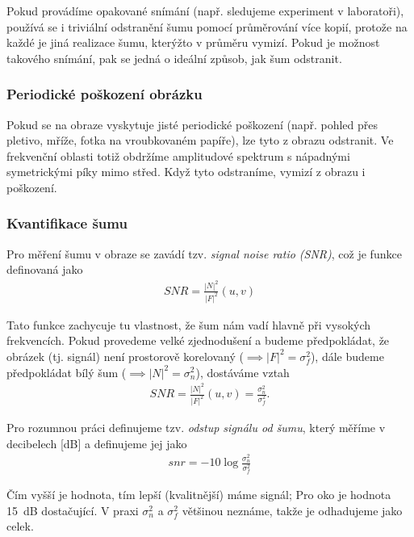 Pokud provádíme opakované snímání (např. sledujeme experiment v laboratoři), používá se i triviální odstranění šumu
pomocí průměrování více kopií, protože na každé je jiná realizace šumu, kterýžto v průměru vymizí. Pokud je možnost
takového snímání, pak se jedná o ideální způsob, jak šum odstranit.


\subsubsection{Periodické poškození obrázku}

Pokud se na obraze vyskytuje jisté periodické poškození (např. pohled přes pletivo, mříže, fotka na vroubkovaném papíře),
lze tyto  z obrazu odstranit. Ve frekvenční oblasti totiž obdržíme amplitudové spektrum s nápadnými
symetrickými píky mimo střed. Když tyto odstraníme, vymizí z obrazu i poškození.


\subsubsection{Kvantifikace šumu}

Pro měření  šumu v obraze se zavádí tzv. \emph{signal noise ratio (SNR)}, což je funkce definovaná
jako
\begin{align}
SNR=\frac{|N|^2}{|F|^2}(u,v)
\end{align}

Tato funkce zachycuje tu vlastnost, že šum nám vadí hlavně při vysokých frekvencích.
Pokud provedeme velké zjednodušení a budeme předpokládat, že obrázek (tj. signál) není prostorově korelovaný ($ \implies |F|^2 = \sigma_f^2$), dále budeme předpokládat bílý šum ($ \implies |N|^2 = \sigma_n^2$), dostáváme vztah
\begin{align}
SNR=\frac{|N|^2}{|F|^2}(u,v)=\frac{\sigma_n^2}{\sigma_f^2}.
\end{align}

Pro rozumnou práci definujeme tzv. \emph{odstup signálu od šumu}, který měříme v decibelech [dB] a definujeme jej jako
\begin{align}
snr=-10\log\frac{\sigma_n^2}{\sigma_f^2}
\end{align}

Čím vyšší je hodnota, tím lepší (kvalitnější) máme signál; Pro oko je hodnota 15~dB dostačující. V praxi $ \sigma^2_n $ a $ \sigma^2_f $ většinou neznáme, takže je odhadujeme jako celek.

